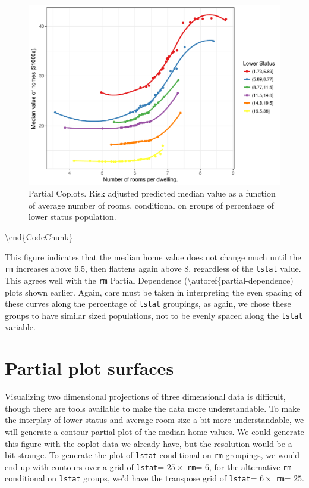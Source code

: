 \documentclass[article]{jss}
\begin{document}
\begin{figure}

{\centering \includegraphics{Regression-rfsrc_files/figure-latex/prtl-coplots2-1} 

}

\caption[Partial Coplots]{Partial Coplots. Risk adjusted predicted median value as a function of average number of rooms, conditional on groups of percentage of lower status population.}\label{fig:prtl-coplots2}
\end{figure}

\textbackslash{}end\{CodeChunk\}

This figure indicates that the median home value does not change much
until the \texttt{rm} increases above 6.5, then flattens again above 8,
regardless of the \texttt{lstat} value. This agrees well with the
\texttt{rm} Partial Dependence
(\textbackslash{}autoref\{partial-dependence) plots shown earlier.
Again, care must be taken in interpreting the even spacing of these
curves along the percentage of \texttt{lstat} groupings, as again, we
chose these groups to have similar sized populations, not to be evenly
spaced along the \texttt{lstat} variable.

\hypertarget{partial-plot-surfaces}{%
\section{Partial plot surfaces}\label{partial-plot-surfaces}}

Visualizing two dimensional projections of three dimensional data is
difficult, though there are tools available to make the data more
understandable. To make the interplay of lower status and average room
size a bit more understandable, we will generate a contour partial plot
of the median home values. We could generate this figure with the coplot
data we already have, but the resolution would be a bit strange. To
generate the plot of \texttt{lstat} conditional on \texttt{rm}
groupings, we would end up with contours over a grid of \texttt{lstat}=
\(25 \times\) \texttt{rm}= \(6\), for the alternative \texttt{rm}
conditional on \texttt{lstat} groups, we'd have the transpose grid of
\texttt{lstat}= \(6 \times\) \texttt{rm}= \(25\).
\end{document}
